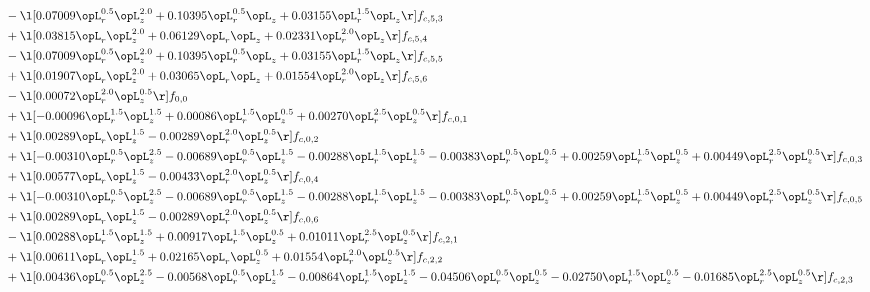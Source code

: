 \begin{alignat}{2}
& - \l[  0.07009 \opL_r^{0.5} \opL_z^{2.0} +  0.10395 \opL_r^{0.5} \opL_z +  0.03155 \opL_r^{1.5} \opL_z  \r] f_{c,5,3} \nonumber \\ 
& + \l[  0.03815 \opL_r \opL_z^{2.0} +  0.06129 \opL_r \opL_z +  0.02331 \opL_r^{2.0} \opL_z  \r] f_{c,5,4} \nonumber \\ 
& - \l[  0.07009 \opL_r^{0.5} \opL_z^{2.0} +  0.10395 \opL_r^{0.5} \opL_z +  0.03155 \opL_r^{1.5} \opL_z  \r] f_{c,5,5} \nonumber \\ 
& + \l[  0.01907 \opL_r \opL_z^{2.0} +  0.03065 \opL_r \opL_z +  0.01554 \opL_r^{2.0} \opL_z  \r] f_{c,5,6} \nonumber \\ 
& - \l[  0.00072 \opL_r^{2.0} \opL_z^{0.5}  \r] f_{0,0} \nonumber \\ 
& + \l[  -0.00096 \opL_r^{1.5} \opL_z^{1.5} +  0.00086 \opL_r^{1.5} \opL_z^{0.5} +  0.00270 \opL_r^{2.5} \opL_z^{0.5}  \r] f_{c,0,1} \nonumber \\ 
& + \l[  0.00289 \opL_r \opL_z^{1.5}   -0.00289 \opL_r^{2.0} \opL_z^{0.5}  \r] f_{c,0,2} \nonumber \\ 
& + \l[  -0.00310 \opL_r^{0.5} \opL_z^{2.5}   -0.00689 \opL_r^{0.5} \opL_z^{1.5}   -0.00288 \opL_r^{1.5} \opL_z^{1.5}   -0.00383 \opL_r^{0.5} \opL_z^{0.5} +  0.00259 \opL_r^{1.5} \opL_z^{0.5} +  0.00449 \opL_r^{2.5} \opL_z^{0.5}  \r] f_{c,0,3} \nonumber \\ 
& + \l[  0.00577 \opL_r \opL_z^{1.5}   -0.00433 \opL_r^{2.0} \opL_z^{0.5}  \r] f_{c,0,4} \nonumber \\ 
& + \l[  -0.00310 \opL_r^{0.5} \opL_z^{2.5}   -0.00689 \opL_r^{0.5} \opL_z^{1.5}   -0.00288 \opL_r^{1.5} \opL_z^{1.5}   -0.00383 \opL_r^{0.5} \opL_z^{0.5} +  0.00259 \opL_r^{1.5} \opL_z^{0.5} +  0.00449 \opL_r^{2.5} \opL_z^{0.5}  \r] f_{c,0,5} \nonumber \\ 
& + \l[  0.00289 \opL_r \opL_z^{1.5}   -0.00289 \opL_r^{2.0} \opL_z^{0.5}  \r] f_{c,0,6} \nonumber \\ 
& - \l[  0.00288 \opL_r^{1.5} \opL_z^{1.5} +  0.00917 \opL_r^{1.5} \opL_z^{0.5} +  0.01011 \opL_r^{2.5} \opL_z^{0.5}  \r] f_{c,2,1} \nonumber \\ 
& + \l[  0.00611 \opL_r \opL_z^{1.5} +  0.02165 \opL_r \opL_z^{0.5} +  0.01554 \opL_r^{2.0} \opL_z^{0.5}  \r] f_{c,2,2} \nonumber \\ 
& + \l[  0.00436 \opL_r^{0.5} \opL_z^{2.5}   -0.00568 \opL_r^{0.5} \opL_z^{1.5}   -0.00864 \opL_r^{1.5} \opL_z^{1.5}   -0.04506 \opL_r^{0.5} \opL_z^{0.5}   -0.02750 \opL_r^{1.5} \opL_z^{0.5}   -0.01685 \opL_r^{2.5} \opL_z^{0.5}  \r] f_{c,2,3} \nonumber \\ 

\end{alignat}
